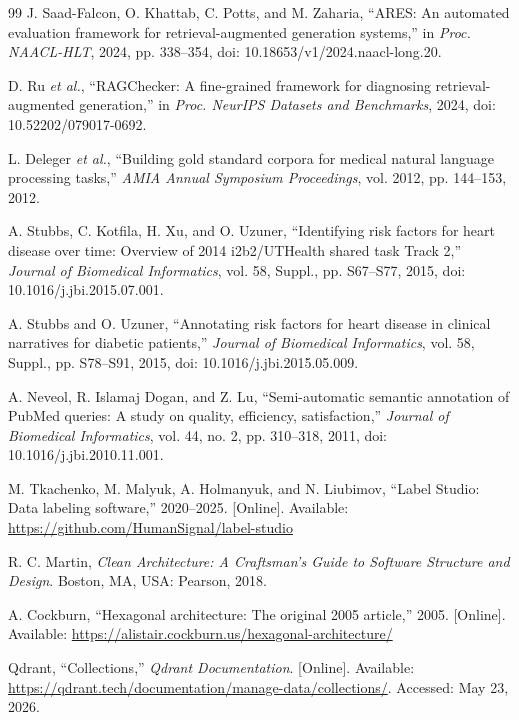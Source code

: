 \begin{thebibliography}{99}
J. Saad-Falcon, O. Khattab, C. Potts, and M. Zaharia, ``ARES: An automated evaluation framework for retrieval-augmented generation systems,'' in \textit{Proc. NAACL-HLT}, 2024, pp. 338--354, doi: 10.18653/v1/2024.naacl-long.20.

D. Ru \textit{et al.}, ``RAGChecker: A fine-grained framework for diagnosing retrieval-augmented generation,'' in \textit{Proc. NeurIPS Datasets and Benchmarks}, 2024, doi: 10.52202/079017-0692.

L. Deleger \textit{et al.}, ``Building gold standard corpora for medical natural language processing tasks,'' \textit{AMIA Annual Symposium Proceedings}, vol. 2012, pp. 144--153, 2012.

A. Stubbs, C. Kotfila, H. Xu, and O. Uzuner, ``Identifying risk factors for heart disease over time: Overview of 2014 i2b2/UTHealth shared task Track 2,'' \textit{Journal of Biomedical Informatics}, vol. 58, Suppl., pp. S67--S77, 2015, doi: 10.1016/j.jbi.2015.07.001.

A. Stubbs and O. Uzuner, ``Annotating risk factors for heart disease in clinical narratives for diabetic patients,'' \textit{Journal of Biomedical Informatics}, vol. 58, Suppl., pp. S78--S91, 2015, doi: 10.1016/j.jbi.2015.05.009.

A. Neveol, R. Islamaj Dogan, and Z. Lu, ``Semi-automatic semantic annotation of PubMed queries: A study on quality, efficiency, satisfaction,'' \textit{Journal of Biomedical Informatics}, vol. 44, no. 2, pp. 310--318, 2011, doi: 10.1016/j.jbi.2010.11.001.

M. Tkachenko, M. Malyuk, A. Holmanyuk, and N. Liubimov, ``Label Studio: Data labeling software,'' 2020--2025. [Online]. Available: \url{https://github.com/HumanSignal/label-studio}

R. C. Martin, \textit{Clean Architecture: A Craftsman's Guide to Software Structure and Design}. Boston, MA, USA: Pearson, 2018.

A. Cockburn, ``Hexagonal architecture: The original 2005 article,'' 2005. [Online]. Available: \url{https://alistair.cockburn.us/hexagonal-architecture/}

Qdrant, ``Collections,'' \textit{Qdrant Documentation}. [Online]. Available: \url{https://qdrant.tech/documentation/manage-data/collections/}. Accessed: May 23, 2026.


\end{thebibliography}
